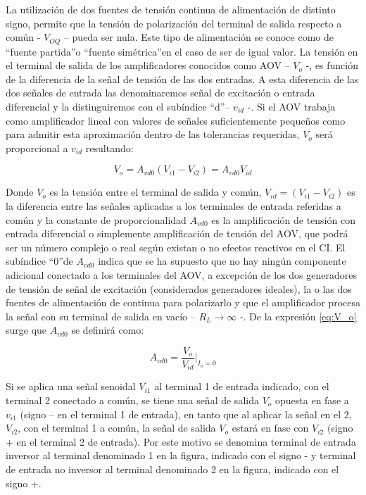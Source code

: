 \documentclass[10pt,spanish,a4paper,openany,notitlepage]{article}
\begin{document}
La utilización de dos fuentes de tensión continua de alimentación de distinto signo, permite que
la tensión de polarización del terminal de salida respecto a común - $V_{OQ}$ – pueda ser nula. Este tipo de
alimentación se conoce como de \textquotedblleft fuente partida\textquotedblright o \textquotedblleft fuente simétrica\textquotedblright en el caso de ser de igual valor.
La tensión en el terminal de salida de los amplificadores conocidos como AOV – $V_o$ -, es función
de la diferencia de la señal de tensión de las dos entradas. A esta diferencia de las dos señales de entrada
las denominaremos señal de excitación o entrada diferencial y la distinguiremos con el subíndice
\textquotedblleft d\textquotedblright – $v_{id}$ -. Si el AOV trabaja como amplificador lineal con valores de señales suficientemente
pequeños como para admitir esta aproximación dentro de las tolerancias requeridas, $V_o$ será proporcional
a $v_{id}$ resultando:

\begin{equation}
    V_o = A_{vd0} (V_{i1} - V_{i2}) = A_{vd0} V_{id}
    \label{eq:V_o}
\end{equation}


Donde $V_o$ es la tensión entre el terminal de salida y común,
$V_{id} = (V_{i1} - V_{i2})$ es la diferencia entre las
señales aplicadas a los terminales de entrada referidas a común y la constante de proporcionalidad $A_{vd0}$
es la amplificación de tensión con entrada diferencial o simplemente amplificación de tensión del AOV,
que podrá ser un número complejo o real según existan o no efectos reactivos en el CI. El subíndice
\textquotedblleft 0\textquotedblright de $A_{vd0}$ indica que se ha supuesto que no hay ningún componente adicional conectado a los terminales
del AOV, a excepción de los dos generadores de tensión de señal de excitación (considerados
generadores ideales), la o las dos fuentes de alimentación de continua para polarizarlo y que el amplificador
procesa la señal con su terminal de salida en vacío – $R_L \rightarrow \infty$ -. De la expresión \ref{eq:V_o} surge que
$A_{vd0}$ se definirá como:

\begin{equation}
    A_{vd0} = \frac{V_o}{V_{id}} \Biggr|_{I_o = 0}
    \label{eq:A_vd0}
\end{equation}

Si se aplica una señal senoidal $V_{i1}$ al terminal 1 de entrada indicado, con el terminal 2 conectado a
común, se tiene una señal de salida $V_o$ opuesta en fase a $v_{i1}$ (signo – en el terminal 1 de entrada), en
tanto que al aplicar la señal en el 2, $V_{i2}$, con el terminal 1 a común, la señal de salida $V_o$ estará en
fase con $V_{i2}$ (signo + en el terminal 2 de entrada). Por este motivo se denomina terminal de entrada
inversor al terminal denominado 1 en la figura, indicado con el signo - y terminal de entrada
no inversor al terminal denominado 2 en la figura, indicado con el signo +.
\end{document}
